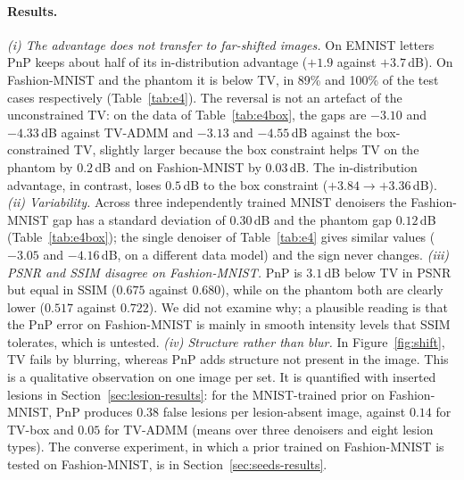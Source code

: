 \paragraph{Results.}
\emph{(i) The advantage does not transfer to far-shifted images.} On EMNIST letters PnP keeps about half of its in-distribution advantage ($+1.9$ against $+3.7$\,dB). On Fashion-MNIST and the phantom it is below TV, in 89\% and 100\% of the test cases respectively (Table~\ref{tab:e4}).
The reversal is not an artefact of the unconstrained TV: on the data of Table~\ref{tab:e4box}, the gaps are $-3.10$ and $-4.33$\,dB against TV-ADMM and $-3.13$ and $-4.55$\,dB against the box-constrained TV, slightly larger because the box constraint helps TV on the phantom by $0.2$\,dB and on Fashion-MNIST by $0.03$\,dB. The in-distribution advantage, in contrast,
loses $0.5$\,dB to the box constraint ($+3.84\to+3.36$\,dB).
\emph{(ii) Variability.} Across three independently trained MNIST denoisers the Fashion-MNIST gap has a standard deviation of $0.30$\,dB and the phantom gap $0.12$\,dB (Table~\ref{tab:e4box}); the single denoiser of Table~\ref{tab:e4} gives similar values ($-3.05$ and $-4.16$\,dB, on a different data model) and the sign never changes.
\emph{(iii) PSNR and SSIM disagree on Fashion-MNIST.} PnP is $3.1$\,dB below TV in PSNR but equal in SSIM ($0.675$ against $0.680$), while on the phantom both are clearly lower ($0.517$ against $0.722$). We did not examine why; a plausible reading is that the PnP error on Fashion-MNIST is
mainly in smooth intensity levels that SSIM tolerates, which is untested.
\emph{(iv) Structure rather than blur.} In Figure~\ref{fig:shift}, TV fails by blurring, whereas PnP adds structure not present in the image. This is a qualitative observation on one image per set. It is quantified with inserted lesions in
Section~\ref{sec:lesion-results}: for the MNIST-trained prior on Fashion-MNIST, PnP produces $0.38$ false lesions per lesion-absent image, against $0.14$ for TV-box and $0.05$ for TV-ADMM (means over three denoisers and eight lesion types).
The converse experiment, in which a prior trained on Fashion-MNIST is tested on Fashion-MNIST, is in Section~\ref{sec:seeds-results}.


